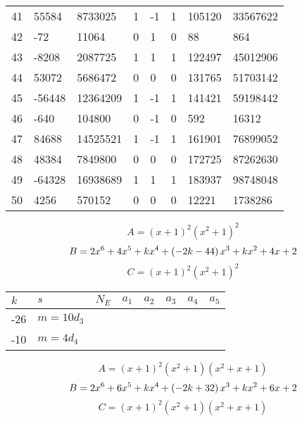 \documentclass{amsart}
\begin{document}
\begin{longtable}{|l|l|l|lllll|}
41&55584&8733025&1&-1&1&105120&33567622\\
42&-72&11064&0&1&0&88&864\\
43&-8208&2087725&1&1&1&122497&45012906\\
44&53072&5686472&0&0&0&131765&51703142\\
45&-56448&12364209&1&-1&1&141421&59198442\\
46&-640&104800&0&-1&0&592&16312\\
47&84688&14525521&1&-1&1&161901&76899052\\
48&48384&7849800&0&0&0&172725&87262630\\
49&-64328&16938689&1&1&1&183937&98748048\\
50&4256&570152&0&0&0&12221&1738286\\
\hline
\end{longtable}
$$A=(x
 + 1)^{2}(x^2
 + 1)^{2}$$
$$B=2\*x^6
 + 4\*x^5
 + k\*x^4
 + \left(-2\*k
 - 44\right) \*x^3
 + k\*x^2
 + 4\*x
 + 2$$
$$C=(x
 + 1)^{2}(x^2
 + 1)^{2}$$
\begin{longtable}{|l|l|l|lllll|}
\hline
$k$ & $s$ & $N_E$ & $a_1$ & $a_2$ & $a_3$ & $a_4$ & $a_5$\\
\hline
-26&$m=10d_{3}$&&\multicolumn{5}{c|}{}\\
-10&$m=4d_{4}$&&\multicolumn{5}{c|}{}\\
\hline
\end{longtable}
$$A=(x
 + 1)^{2}(x^2
 + 1)(x^2
 + x
 + 1)$$
$$B=2\*x^6
 + 6\*x^5
 + k\*x^4
 + \left(-2\*k
 + 32\right) \*x^3
 + k\*x^2
 + 6\*x
 + 2$$
$$C=(x
 + 1)^{2}(x^2
 + 1)(x^2
 + x
 + 1)$$
\end{document}
